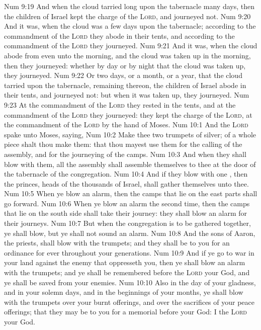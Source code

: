\vs Num 9:19 And when the cloud tarried long upon the tabernacle many days, then the children of Israel kept the charge of the \textsc{Lord}, and journeyed not.
\vs Num 9:20 And  it was, when the cloud was a few days upon the tabernacle; according to the commandment of the \textsc{Lord} they abode in their tents, and according to the commandment of the \textsc{Lord} they journeyed.
\vs Num 9:21 And  it was, when the cloud abode from even unto the morning, and  the cloud was taken up in the morning, then they journeyed: whether  by day or by night that the cloud was taken up, they journeyed.
\vs Num 9:22 Or  two days, or a month, or a year, that the cloud tarried upon the tabernacle, remaining thereon, the children of Israel abode in their tents, and journeyed not: but when it was taken up, they journeyed.
\vs Num 9:23 At the commandment of the \textsc{Lord} they rested in the tents, and at the commandment of the \textsc{Lord} they journeyed: they kept the charge of the \textsc{Lord}, at the commandment of the \textsc{Lord} by the hand of Moses.
\vs Num 10:1 And the \textsc{Lord} spake unto Moses, saying,
\vs Num 10:2 Make thee two trumpets of silver; of a whole piece shalt thou make them: that thou mayest use them for the calling of the assembly, and for the journeying of the camps.
\vs Num 10:3 And when they shall blow with them, all the assembly shall assemble themselves to thee at the door of the tabernacle of the congregation.
\vs Num 10:4 And if they blow  with one , then the princes,  heads of the thousands of Israel, shall gather themselves unto thee.
\vs Num 10:5 When ye blow an alarm, then the camps that lie on the east parts shall go forward.
\vs Num 10:6 When ye blow an alarm the second time, then the camps that lie on the south side shall take their journey: they shall blow an alarm for their journeys.
\vs Num 10:7 But when the congregation is to be gathered together, ye shall blow, but ye shall not sound an alarm.
\vs Num 10:8 And the sons of Aaron, the priests, shall blow with the trumpets; and they shall be to you for an ordinance for ever throughout your generations.
\vs Num 10:9 And if ye go to war in your land against the enemy that oppresseth you, then ye shall blow an alarm with the trumpets; and ye shall be remembered before the \textsc{Lord} your God, and ye shall be saved from your enemies.
\vs Num 10:10 Also in the day of your gladness, and in your solemn days, and in the beginnings of your months, ye shall blow with the trumpets over your burnt offerings, and over the sacrifices of your peace offerings; that they may be to you for a memorial before your God: I  the \textsc{Lord} your God.
